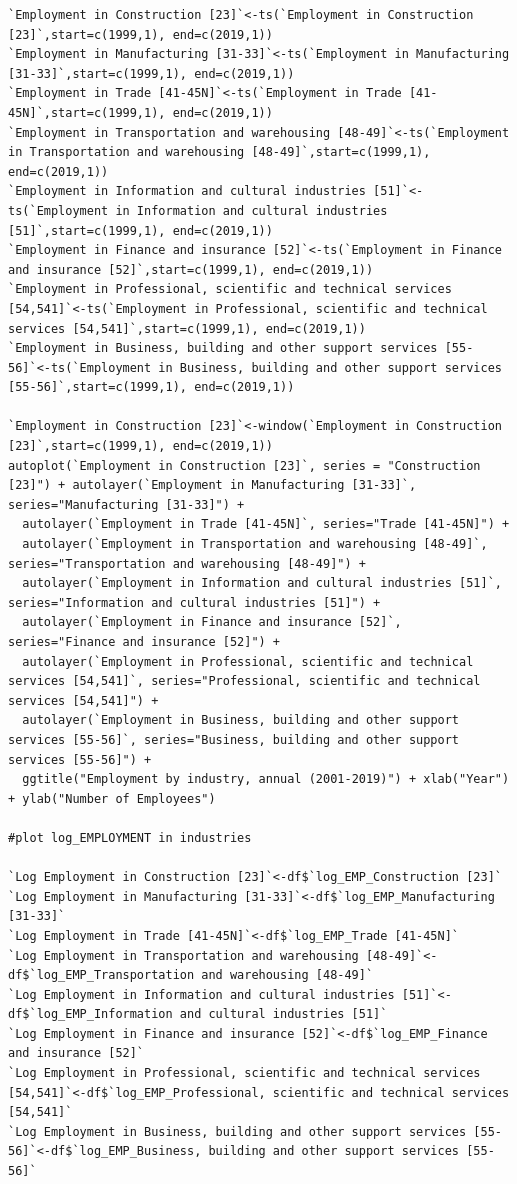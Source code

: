 \documentclass[12pt]{article}
\begin{document}
\begin{verbatim}
`Employment in Construction [23]`<-ts(`Employment in Construction [23]`,start=c(1999,1), end=c(2019,1))
`Employment in Manufacturing [31-33]`<-ts(`Employment in Manufacturing [31-33]`,start=c(1999,1), end=c(2019,1))
`Employment in Trade [41-45N]`<-ts(`Employment in Trade [41-45N]`,start=c(1999,1), end=c(2019,1))
`Employment in Transportation and warehousing [48-49]`<-ts(`Employment in Transportation and warehousing [48-49]`,start=c(1999,1), end=c(2019,1))
`Employment in Information and cultural industries [51]`<-ts(`Employment in Information and cultural industries [51]`,start=c(1999,1), end=c(2019,1))
`Employment in Finance and insurance [52]`<-ts(`Employment in Finance and insurance [52]`,start=c(1999,1), end=c(2019,1))
`Employment in Professional, scientific and technical services [54,541]`<-ts(`Employment in Professional, scientific and technical services [54,541]`,start=c(1999,1), end=c(2019,1))
`Employment in Business, building and other support services [55-56]`<-ts(`Employment in Business, building and other support services [55-56]`,start=c(1999,1), end=c(2019,1))

`Employment in Construction [23]`<-window(`Employment in Construction [23]`,start=c(1999,1), end=c(2019,1)) 
autoplot(`Employment in Construction [23]`, series = "Construction [23]") + autolayer(`Employment in Manufacturing [31-33]`, series="Manufacturing [31-33]") +
  autolayer(`Employment in Trade [41-45N]`, series="Trade [41-45N]") +
  autolayer(`Employment in Transportation and warehousing [48-49]`, series="Transportation and warehousing [48-49]") +
  autolayer(`Employment in Information and cultural industries [51]`, series="Information and cultural industries [51]") +
  autolayer(`Employment in Finance and insurance [52]`, series="Finance and insurance [52]") +
  autolayer(`Employment in Professional, scientific and technical services [54,541]`, series="Professional, scientific and technical services [54,541]") +
  autolayer(`Employment in Business, building and other support services [55-56]`, series="Business, building and other support services [55-56]") +
  ggtitle("Employment by industry, annual (2001-2019)") + xlab("Year") + ylab("Number of Employees")

#plot log_EMPLOYMENT in industries

`Log Employment in Construction [23]`<-df$`log_EMP_Construction [23]`
`Log Employment in Manufacturing [31-33]`<-df$`log_EMP_Manufacturing [31-33]`
`Log Employment in Trade [41-45N]`<-df$`log_EMP_Trade [41-45N]`
`Log Employment in Transportation and warehousing [48-49]`<-df$`log_EMP_Transportation and warehousing [48-49]`
`Log Employment in Information and cultural industries [51]`<-df$`log_EMP_Information and cultural industries [51]`
`Log Employment in Finance and insurance [52]`<-df$`log_EMP_Finance and insurance [52]`
`Log Employment in Professional, scientific and technical services [54,541]`<-df$`log_EMP_Professional, scientific and technical services [54,541]`
`Log Employment in Business, building and other support services [55-56]`<-df$`log_EMP_Business, building and other support services [55-56]`


\end{verbatim}
\end{document}
